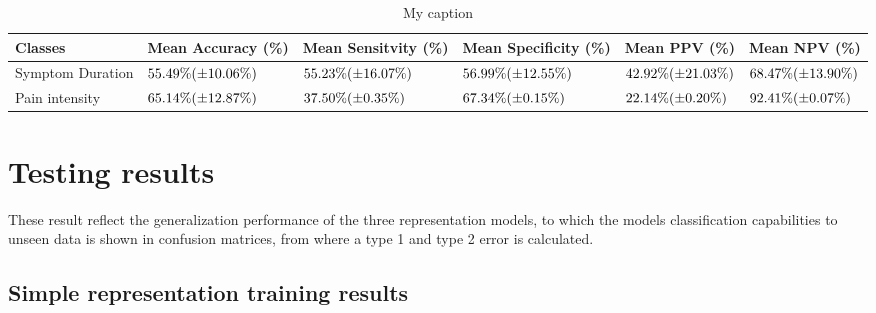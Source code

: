 \documentclass[12pt,a4paper]{article}
\begin{document}
\begin{table}[H]
\centering
\begin{tabular}{|p{2cm}|p{2.2cm}|p{2.2cm}|p{2.2cm}|p{2cm}|p{2cm}|}
\hline
Classes          & Mean Accuracy (\%) & Mean Sensitvity (\%) & Mean Specificity (\%) & Mean PPV (\%) & Mean NPV (\%) \\ \hline
Symptom Duration & $55.49\%\newline(\pm10.06\%)$ & $55.23\%\newline(\pm16.07\%)$ & $56.99\%\newline(\pm12.55\%)$ & $42.92\%\newline(\pm21.03\%)$ & $68.47\%\newline(\pm13.90\%)$ \\ \hline
Pain intensity   & $65.14\%\newline(\pm12.87\%)$ & $37.50\%\newline(\pm0.35\%)$ & $67.34\%\newline(\pm0.15\%)$ & $22.14\%\newline(\pm0.20\%)$ & $92.41\%\newline(\pm0.07\%)$ \\ \hline
\end{tabular}
\label{my-label}
\caption{My caption}
\end{table}




\section{Testing results}
These result reflect the generalization performance of the three representation models, to which the models classification capabilities to unseen data is shown in confusion matrices, from where a type 1 and type 2 error is calculated. 


\subsection{Simple representation training results}
\end{document}
